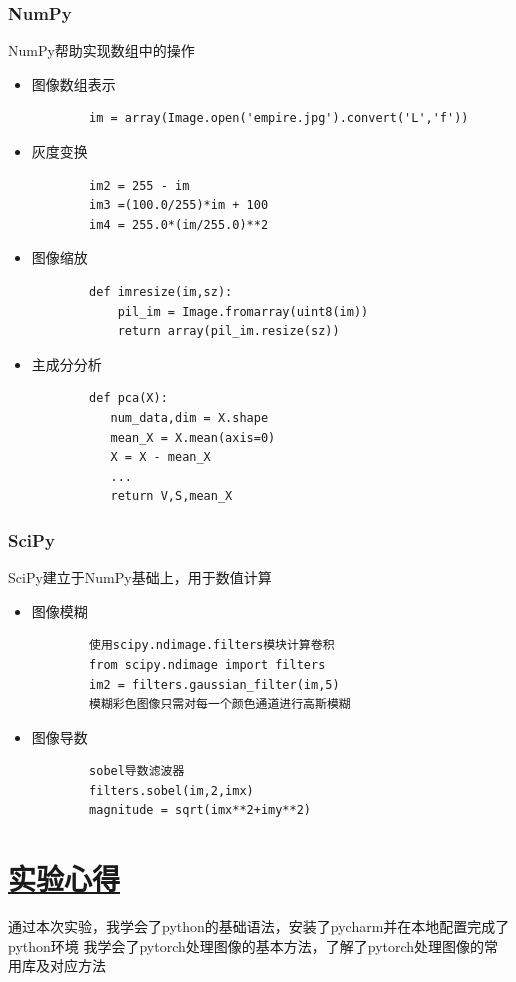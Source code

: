 \documentclass[a4paper,12pt]{article}
\begin{document}
\subsubsection{\color{green}NumPy}
NumPy帮助实现数组中的操作
\begin{itemize}
    \item 图像数组表示
        \begin{verbatim}
        im = array(Image.open('empire.jpg').convert('L','f'))
        \end{verbatim}
    \item 灰度变换
        \begin{verbatim}
        im2 = 255 - im
        im3 =(100.0/255)*im + 100
        im4 = 255.0*(im/255.0)**2
        \end{verbatim}
    \item 图像缩放
        \begin{verbatim}
        def imresize(im,sz):
            pil_im = Image.fromarray(uint8(im))
            return array(pil_im.resize(sz))
        \end{verbatim}
    \item 主成分分析
        \begin{verbatim}
        def pca(X):
           num_data,dim = X.shape
           mean_X = X.mean(axis=0)
           X = X - mean_X
           ...
           return V,S,mean_X
        \end{verbatim}
\end{itemize}

\subsubsection{\color{green}SciPy}
SciPy建立于NumPy基础上，用于数值计算
\begin{itemize}
    \item 图像模糊
        \begin{verbatim}
        使用scipy.ndimage.filters模块计算卷积
        from scipy.ndimage import filters
        im2 = filters.gaussian_filter(im,5)
        模糊彩色图像只需对每一个颜色通道进行高斯模糊
        \end{verbatim}
    \item 图像导数
        \begin{verbatim}
        sobel导数滤波器
        filters.sobel(im,2,imx)
        magnitude = sqrt(imx**2+imy**2)
        \end{verbatim}
\end{itemize}

\newpage
\section{\underline{\color{blue}实验心得}}
通过本次实验，我学会了python的基础语法，安装了pycharm并在本地配置完成了python环境
我学会了pytorch处理图像的基本方法，了解了pytorch处理图像的常用库及对应方法
\end{document}

